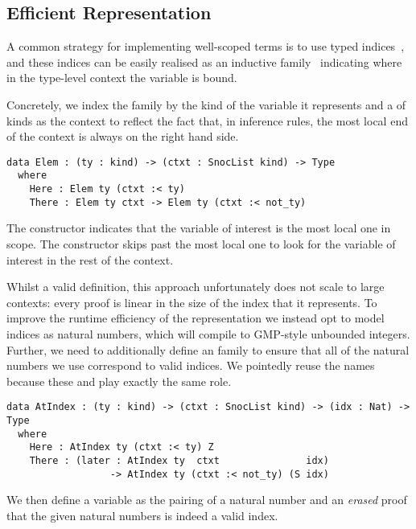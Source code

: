 \subsection{Efficient \DeBruijn{} Representation}
\label{sec:design:deBruijn}

A common strategy for implementing well-scoped terms is to use typed
\emph{\DeBruijn{}} indices~\cite{MANUAL:journals/math/debruijn72}, and these indices can be easily realised as an inductive family~\cite{DBLP:journals/fac/Dybjer94}
indicating where in the type-level context the variable is bound.

Concretely, we index the  family by the kind of the variable it represents and a  of kinds as the context to reflect the fact that,
in inference rules, the most local end of the context is always on the right hand side.

\begin{Verbatim}
data Elem : (ty : kind) -> (ctxt : SnocList kind) -> Type
  where
    Here : Elem ty (ctxt :< ty)
    There : Elem ty ctxt -> Elem ty (ctxt :< not_ty)
\end{Verbatim}

The  constructor indicates that the variable of interest is
the most local one in scope.
%
The  constructor skips past the most local one to look for
the variable of interest in the rest of the context.

Whilst a valid definition, this approach unfortunately does not scale to
large contexts:
%
every  proof is linear in the size of the \DeBruijn{}
index that it represents.
%
To improve the runtime efficiency of the representation we instead opt to
model \DeBruijn{} indices as natural numbers, which \Idris{} will compile to
GMP-style unbounded integers.
%
Further, we need to additionally define an  family to ensure that
all of the natural numbers we use correspond to valid indices.
%
We pointedly reuse the  names because these 
and  play exactly the same role.

\begin{Verbatim}
data AtIndex : (ty : kind) -> (ctxt : SnocList kind) -> (idx : Nat) -> Type
  where
    Here : AtIndex ty (ctxt :< ty) Z
    There : (later : AtIndex ty  ctxt               idx)
                  -> AtIndex ty (ctxt :< not_ty) (S idx)
\end{Verbatim}

\noindent
We then define a variable as the pairing of a natural number and an \emph{erased}
proof that the given natural numbers is indeed a valid \DeBruijn{} index.

